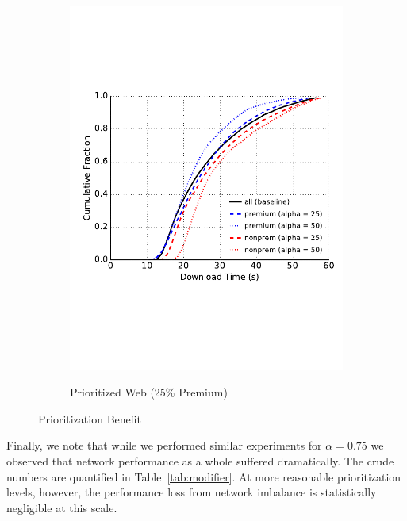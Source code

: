 \begin{figure}
\begin{subfigure}[t]{0.32\textwidth}
\includegraphics[trim={0 3cm 0 3cm}, clip, width=1.0\textwidth]{images/modifier_pr25_bulk.pdf}
		\label{fig:stats_c}
		\caption{Prioritized Web (25\% Premium)}
	\end{subfigure}
	\label{fig:measurements}
	\caption{Prioritization Benefit}
\end{figure}

Finally, we note that while we performed similar experiments for $\alpha = 0.75$
we observed that network performance as a whole suffered dramatically. The crude
numbers are quantified in Table~\ref{tab:modifier}. At more reasonable
prioritization levels, however, the performance loss from network imbalance is
statistically negligible at this scale.

